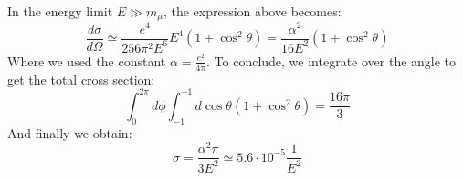 \documentclass[../main.tex]{subfiles}
\begin{document}
In the energy limit $E\gg m_\mu$, the expression above becomes:
\[
\frac{d\sigma}{d\Omega}\simeq\frac{e^4}{256\pi^2E^6}E^4(1+\cos^2\theta)=\frac{\alpha^2}{16E^2}(1+\cos^2\theta)
\]
Where we used the constant $\alpha=\frac{e^2}{4\pi}$. To conclude, we integrate over the angle to get the total cross section:
\[
\int_0^{2\pi}d\phi\int_{-1}^{+1}d\cos\theta(1+\cos^2\theta)=\frac{16\pi}{3}
\]
And finally we obtain:
\[
\sigma=\frac{\alpha^2\pi}{3E^2}\simeq5.6\cdot10^{-5}\frac{1}{E^2}
\]
\end{document}
